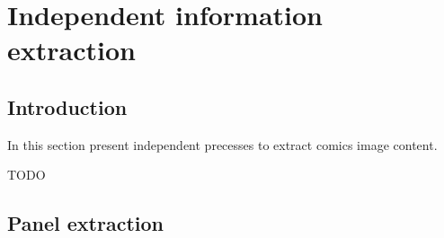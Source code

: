 \chapter{Independent information extraction}
\label{chap:independent}
\graphicspath{{./chapters/4-independent/figs/}}

\section{Introduction}
\label{sec:in:intro}

In this section present independent precesses to extract comics image content.

TODO

\section{Panel extraction}
\label{sec:in:panel_extraction}


